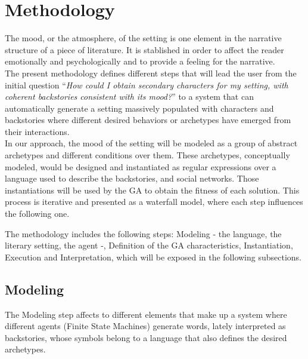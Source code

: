 \documentclass{sig-alternate}
\begin{document}

%
%

\section{Methodology}
\label{sec:methodology}

The mood, or the atmosphere, of the setting is one element in the narrative structure of a piece of literature. It is stablished in order to affect the reader emotionally and psychologically and to provide a feeling for the narrative.
\\

The present methodology defines different steps that will lead the user from the initial question ``\textit{How could I obtain secondary characters for my setting, with coherent backstories consistent with its mood?}'' to a system that can automatically generate a setting massively populated with characters and backstories where different desired behaviors or archetypes have emerged from their interactions.\\

In our approach, the mood of the setting will be modeled as a group of abstract archetypes and different conditions over them. These archetypes, conceptually modeled, would be designed and instantiated as regular expressions over a language used to describe the backstories, and social networks. Those instantiations will be used by the GA to obtain the fitness of each solution. This process is iterative and presented as a waterfall model, where each step influences the following one.

The methodology includes the following steps: Modeling - the language, the literary setting, the agent -, Definition of the GA characteristics, Instantiation, Execution and Interpretation, which will be exposed in the following subsections.


\subsection{Modeling}

The Modeling step affects to different elements that make up a system where different agents (Finite State Machines) generate words, lately interpreted as backstories, whose symbols belong to a language that also defines the desired archetypes.
\end{document}
